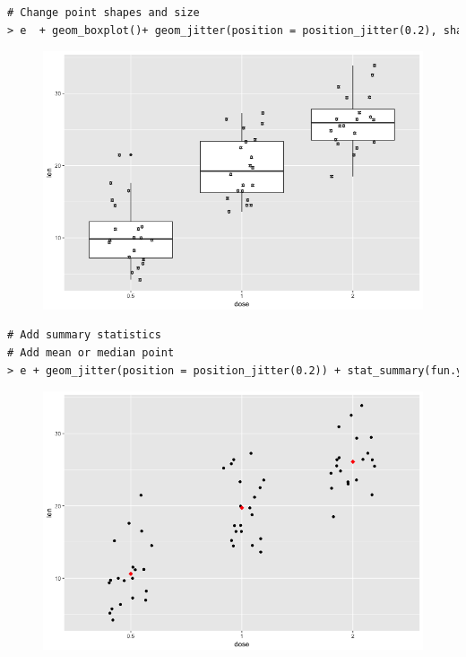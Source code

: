 \begin{lstlisting}[language=html]
# Change point shapes and size
> e  + geom_boxplot()+ geom_jitter(position = position_jitter(0.2), shape = 11, size = 1.2)
\end{lstlisting}
\begin{figure}[H]\begin{center}\includegraphics[scale=1 ]{ilu/bg111.png}\end{center}\end{figure} 
\begin{lstlisting}[language=html]
# Add summary statistics
# Add mean or median point
> e + geom_jitter(position = position_jitter(0.2)) + stat_summary(fun.y = mean, geom = "point", shape = 18, size = 3, color = "red")
\end{lstlisting}
\begin{figure}[H]\begin{center}\includegraphics[scale=1 ]{ilu/bg112.png}\end{center}\end{figure} 
